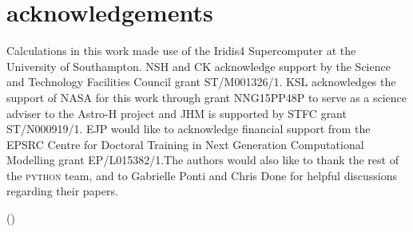 \documentclass[a4paper,fleqn,usenatbib]{mnras}
\begin{document}
\section{acknowledgements}
Calculations in this work made use of the Iridis4 Supercomputer at the
University of Southampton. NSH and CK  acknowledge support by the
Science and Technology Facilities Council grant ST/M001326/1.  
KSL acknowledges the support of NASA for this work through grant 
NNG15PP48P to serve as a 
science adviser to the Astro-H project and JHM is supported by STFC 
grant ST/N000919/1. EJP would like to acknowledge financial support from 
the EPSRC Centre for Doctoral Training in Next Generation Computational 
Modelling grant EP/L015382/1.The authors would
also like to thank the rest of the \textsc{python} team, and to Gabrielle Ponti 
and Chris Done for helpful discussions regarding their papers.





()
\label{lastpage}

\bsp	%
\end{document}
